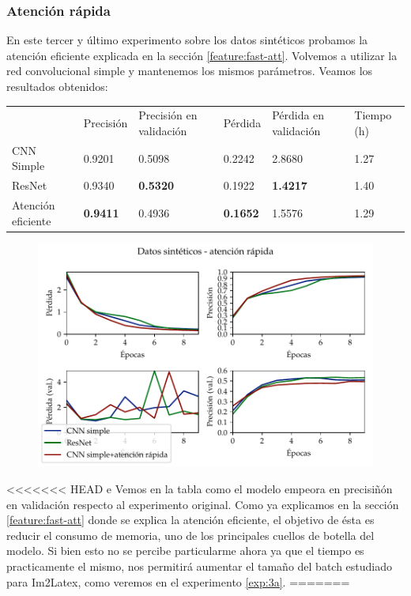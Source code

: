 \documentclass[a4paper, 20pt, dvipsnames]{article}
\begin{document}
\subsubsection{Atención rápida}
\label{exp:toy3}

En este tercer y último experimento sobre los datos sintéticos probamos la
atención eficiente explicada en la sección \ref{feature:fast-att}. Volvemos a
utilizar la red convolucional simple y mantenemos los mismos parámetros. Veamos
los resultados obtenidos:

\begin{table}[h]
	\centering
	\begin{tabular}{llllll}
		& Precisión       & Precisión en validación & Pérdida         & Pérdida en validación & Tiempo (h) \\ \cline{2-6} 
		CNN Simple         & 0.9201          & 0.5098                  & 0.2242          & 2.8680                & 1.27       \\
		ResNet             & 0.9340          & \textbf{0.5320}         & 0.1922          & \textbf{1.4217}       & 1.40       \\
		Atención eficiente & \textbf{0.9411} & 0.4936                  & \textbf{0.1652} & 1.5576                & 1.29      
	\end{tabular}
\end{table}

\begin{figure}[H]
	\centering
	\includegraphics{fig/toy-3.pdf}
\end{figure}
<<<<<<< HEAD
e
Vemos en la tabla como el modelo empeora en precisiñón en validación respecto al experimento original. Como ya explicamos en la sección \ref{feature:fast-att} donde se explica la atención eficiente, el objetivo de ésta es reducir el consumo de memoria, uno de los principales cuellos de botella del modelo. Si bien esto no se percibe particularme ahora ya que el tiempo es practicamente el mismo, nos permitirá aumentar el tamaño del batch estudiado para Im2Latex, como veremos en el experimento \ref{exp:3a}.
=======
\end{document}
